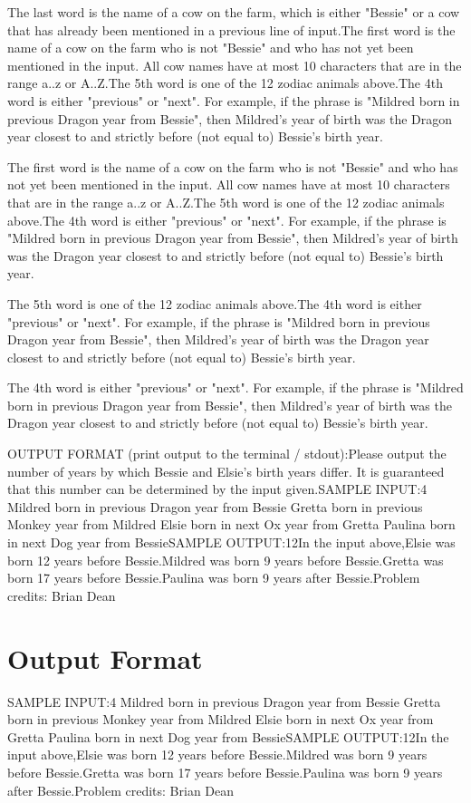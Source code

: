 \documentclass[12pt]{article}
\begin{document}
The last word is the name of a cow on the farm, which is either "Bessie" or a
cow that has already been mentioned in a previous line of input.The first word is the name of a cow on the farm who is not "Bessie" and who  has
not yet been mentioned  in the input.  All cow names have at most 10 characters
that are in the range a..z or A..Z.The 5th word is one of the 12 zodiac animals above.The 4th word is either "previous" or "next".  For example, if the phrase is
"Mildred born in previous Dragon year from Bessie", then Mildred's year of 
birth was the Dragon year closest to and strictly before (not equal to) 
Bessie's birth year.

The first word is the name of a cow on the farm who is not "Bessie" and who  has
not yet been mentioned  in the input.  All cow names have at most 10 characters
that are in the range a..z or A..Z.The 5th word is one of the 12 zodiac animals above.The 4th word is either "previous" or "next".  For example, if the phrase is
"Mildred born in previous Dragon year from Bessie", then Mildred's year of 
birth was the Dragon year closest to and strictly before (not equal to) 
Bessie's birth year.

The 5th word is one of the 12 zodiac animals above.The 4th word is either "previous" or "next".  For example, if the phrase is
"Mildred born in previous Dragon year from Bessie", then Mildred's year of 
birth was the Dragon year closest to and strictly before (not equal to) 
Bessie's birth year.

The 4th word is either "previous" or "next".  For example, if the phrase is
"Mildred born in previous Dragon year from Bessie", then Mildred's year of 
birth was the Dragon year closest to and strictly before (not equal to) 
Bessie's birth year.

OUTPUT FORMAT (print output to the terminal / stdout):Please output the number of years by which Bessie and Elsie's birth years differ.
It is guaranteed that this number can be determined by the input given.SAMPLE INPUT:4
Mildred born in previous Dragon year from Bessie
Gretta born in previous Monkey year from Mildred
Elsie born in next Ox year from Gretta
Paulina born in next Dog year from BessieSAMPLE OUTPUT:12In the input above,Elsie was born 12 years before Bessie.Mildred was born 9 years
before Bessie.Gretta was born 17 years before Bessie.Paulina
was born 9 years after Bessie.Problem credits: Brian Dean

\section*{Output Format}
SAMPLE INPUT:4
Mildred born in previous Dragon year from Bessie
Gretta born in previous Monkey year from Mildred
Elsie born in next Ox year from Gretta
Paulina born in next Dog year from BessieSAMPLE OUTPUT:12In the input above,Elsie was born 12 years before Bessie.Mildred was born 9 years
before Bessie.Gretta was born 17 years before Bessie.Paulina
was born 9 years after Bessie.Problem credits: Brian Dean
\end{document}
